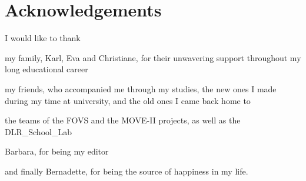 \cleardoublepage

\hspace{2.5cm}
\section*{Acknowledgements}

I would like to thank

my family, Karl, Eva and Christiane, for their unwavering support throughout my long educational career

my friends, who accompanied me through my studies, the new ones I made during my time at university, and the old ones I came back home to

the teams of the FOVS and the MOVE-II projects, as well as the DLR\_School\_Lab

Barbara, for being my editor

and finally Bernadette, for being the source of happiness in my life.

